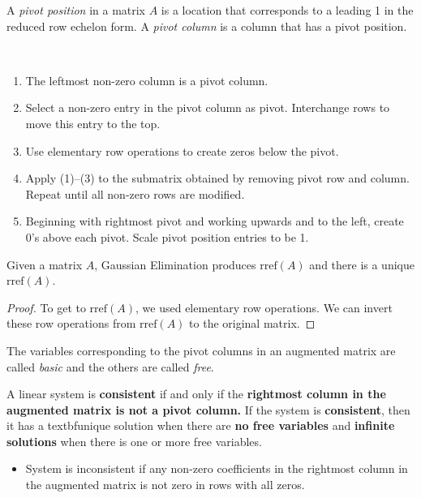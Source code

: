 \documentclass[11pt]{scrartcl}
\theoremstyle{dotlessP}
\theoremstyle{dotlessN}
\begin{document}
\begin{definition}
	A \textit{pivot position} in a matrix $A$ is a location that corresponds to a leading 1 in the reduced row echelon form. A \textit{pivot column} is a column that has a pivot position.
\end{definition}
\begin{algorithm}
	\
	\begin{enumerate}
		\item The leftmost non-zero column is a pivot column.
		\item Select a non-zero entry in the pivot column as pivot. Interchange rows to move this entry to the top.
		\item Use elementary row operations to create zeros below the pivot.
		\item Apply (1)--(3) to the submatrix obtained by removing pivot row and column. Repeat until all non-zero rows are modified.
		\item Beginning with rightmost pivot and working upwards and to the left, create 0's above each pivot. Scale pivot position entries to be 1.
	\end{enumerate}
\end{algorithm}
\begin{theorem}
	Given a matrix $A$, Gaussian Elimination produces $\text{rref}(A)$ and there is a unique  $\text{rref}(A)$.
\end{theorem}
\begin{proof}
	To get to $\text{rref}(A)$, we used elementary row operations. We can invert these row operations from  $\text{rref}(A)$ to the original matrix.
\end{proof}
\begin{definition}
	The variables corresponding to the pivot columns in an augmented matrix are called \textit{basic} and the others are called \textit{free}.
\end{definition}
\begin{fact}
	A linear system is \textbf{consistent} if and only if the \textbf{rightmost column in the augmented matrix is not a pivot column.} If the system is \textbf{consistent}, then it has a textbf{unique solution} when there are \textbf{no free variables} and \textbf{infinite solutions} when there is one or more free variables.
\end{fact}
\begin{itemize}
	\item System is inconsistent if any non-zero coefficients in the rightmost column in the augmented matrix is not zero in rows with all zeros.
\end{itemize}
\end{document}
